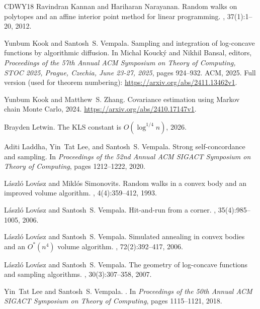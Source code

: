 \documentclass[11pt]{article}
\numberwithin{equation}{section}
\theoremstyle{definition}
\begin{document}
\begin{thebibliography}{CDWY18}
Ravindran Kannan and Hariharan Narayanan.
\newblock Random walks on polytopes and an affine interior point method for
  linear programming.
, 37(1):1--20, 2012.

Yunbum Kook and Santosh~S. Vempala.
\newblock Sampling and integration of log-concave functions by algorithmic
  diffusion.
\newblock In Michal Kouck{\'{y}} and Nikhil Bansal, editors, {\em Proceedings
  of the 57th Annual {ACM} Symposium on Theory of Computing, {STOC} 2025,
  Prague, Czechia, June 23-27, 2025}, pages 924--932. {ACM}, 2025.
\newblock Full version (used for theorem numbering):
\url{https://arxiv.org/abs/2411.13462v1}.

Yunbum Kook and Matthew~S. Zhang.
\newblock Covariance estimation using {M}arkov chain {M}onte {C}arlo, 2024.
\newblock \url{https://arxiv.org/abs/2410.17147v1}.

Brayden Letwin.
\newblock The {KLS} constant is {$O(\log^{1/4} n)$}, 2026.

Aditi Laddha, Yin~Tat Lee, and Santosh~S. Vempala.
\newblock Strong self-concordance and sampling.
\newblock In {\em Proceedings of the 52nd Annual ACM SIGACT Symposium on Theory
  of Computing}, pages 1212--1222, 2020.

L{\'a}szl{\'o} Lov{\'a}sz and Mikl{\'o}s Simonovits.
\newblock Random walks in a convex body and an improved volume algorithm.
, 4(4):359--412, 1993.

L{\'a}szl{\'o} Lov{\'a}sz and Santosh~S. Vempala.
\newblock Hit-and-run from a corner.
, 35(4):985--1005, 2006.

L{\'a}szl{\'o} Lov{\'a}sz and Santosh~S. Vempala.
\newblock Simulated annealing in convex bodies and an {$O^*(n^4)$} volume
  algorithm.
, 72(2):392--417, 2006.

L{\'a}szl{\'o} Lov{\'a}sz and Santosh~S. Vempala.
\newblock The geometry of log-concave functions and sampling algorithms.
, 30(3):307--358, 2007.

Yin~Tat Lee and Santosh~S. Vempala.
.
\newblock In {\em Proceedings of the 50th Annual ACM SIGACT Symposium on Theory
  of Computing}, pages 1115--1121, 2018.


\end{thebibliography}
\end{document}

